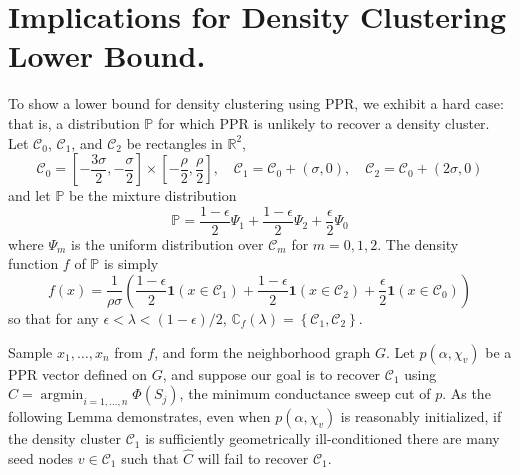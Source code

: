\documentclass{article}
\newcommand{\Reals}{\mathbb{R}}
\newcommand{\set}[1]{\left\{#1\right\}}
\DeclareMathOperator*{\argmin}{argmin}
\newcommand{\Pbb}{\mathbb{P}}
\newcommand{\1}{\mathbf{1}}
\theoremstyle{alden}
\theoremstyle{aldenthm}
\theoremstyle{remark}
\begin{document}
\section{Implications for Density Clustering Lower Bound.}

To show a lower bound for density clustering using PPR, we exhibit a hard case: that is, a distribution $\Pbb$ for which PPR is unlikely to recover a density cluster. Let $\mathcal{C}_0$, $\mathcal{C}_1$, and $\mathcal{C}_2$ be rectangles in $\Reals^2$, 
\begin{equation*}
\mathcal{C}_0 = \left[-\frac{3\sigma}{2}, -\frac{\sigma}{2}\right] \times \left[-\frac{\rho}{2}, \frac{\rho}{2}\right], \quad \mathcal{C}_1 = \mathcal{C}_0 + (\sigma,0), \quad \mathcal{C}_2 = \mathcal{C}_0 + (2\sigma,0)
\end{equation*}
and let $\mathbb{P}$ be the mixture distribution
\begin{equation*}
\mathbb{P} = \frac{1 - \epsilon}{2} \Psi_1 + \frac{1 - \epsilon}{2} \Psi_2 + \frac{\epsilon}{2} \Psi_0
\end{equation*}
where $\Psi_m$ is the uniform distribution over $\mathcal{C}_m$ for $m = 0,1,2$. 
The density function $f$ of $\Pbb$ is simply
\begin{equation*}
f(x) = \frac{1}{\rho\sigma}\left(\frac{1 - \epsilon}{2}\1(x \in \mathcal{C}_1) + \frac{1 - \epsilon}{2}\1(x \in \mathcal{C}_2) + \frac{\epsilon}{2}\1(x \in \mathcal{C}_0)  \right)
\end{equation*}
so that for any $\epsilon < \lambda < (1 - \epsilon)/2$, $\mathbb{C}_{f}(\lambda) = \set{\mathcal{C}_1, \mathcal{C}_2}$. 

Sample $x_1,\ldots,x_n$ from $f$, and form the neighborhood graph $G$. Let $p(\alpha,\chi_v)$ be a PPR vector defined on $G$, and suppose our goal is to recover $\mathcal{C}_1$ using $\widehat{C} = \argmin_{i = 1,\ldots,n} \Phi(S_j)$, the minimum conductance sweep cut of $p$. As the following Lemma demonstrates, even when $p(\alpha,\chi_v)$ is reasonably initialized, if the density cluster $\mathcal{C}_1$ is sufficiently geometrically ill-conditioned there are many seed nodes $v \in \mathcal{C}_1$ such that $\widehat{C}$ will fail to recover $\mathcal{C}_1$.
\end{document}
